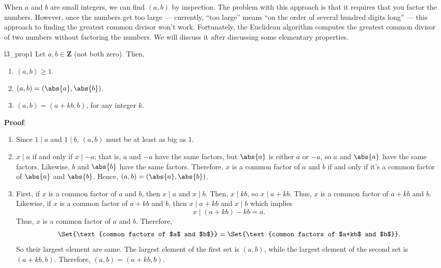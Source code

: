 When $a$ and $b$ are small integers, we can find $(a, b)$ by inspection. The problem
with this approach is that it requires that you factor the numbers. However, once
the numbers get too large --- currently, ``too large'' means ``on the order of several
hundred digits long'' --- this approach to finding the greatest common divisor won't
work. Fortunately, the Euclidean algorithm computes the greatest common divisor
of two numbers without factoring the numbers. We will discuss it after discussing
some elementary properties.
\begin{Proposition}{}{l3_prop1}
    Let $ a,b\in\mathbf{Z} $ (not both zero). Then,
    \begin{enumerate}[(1)]
        \item $ (a,b)\ge 1 $.
        \item $ (a,b)=(\abs{a},\abs{b}) $.
        \item $ (a,b)=(a+kb,b) $, for any integer $ k $.
    \end{enumerate}
    \tcblower{}
    \textbf{Proof}:
    \begin{enumerate}[(1)]
        \item Since $ 1\mid a $ and $ 1\mid b $, $ (a,b) $ must be at least as big as $ 1 $.
        \item $ x\mid a $ if and only if $ x\mid -a $; that is, $ a $ and $ -a $ have the same factors,
              but $ \abs{a} $ is either $ a $ or $ -a $, so $ a $ and $ \abs{a} $ have the same factors. Likewise,
              $ b $ and $ \abs{b} $ have the same factors. Therefore, $ x $ is a common factor of $ a $ and $ b $ if and only if it's
              a common factor of $ \abs{a} $ and $ \abs{b} $. Hence, $ (a,b)=(\abs{a},\abs{b}) $.
        \item First, if $ x $ is a common factor of $ a $ and $ b $, then $ x\mid a $ and $ x\mid b $. Then, $ x\mid kb $,
              so $ x\mid a+kb $. Thus, $ x $ is a common factor of $ a+kb $ and $ b $. Likewise, if $ x $ is a common factor of $ a+kb $
              and $ b $, then $ x\mid a+kb $ and $ x\mid b $ which implies
              \[ x\mid (a+kb)-kb=a. \]
              Thus, $ x $ is a common factor of $ a $ and $ b $. Therefore,
              \[ \Set{\text{common factors of $a$ and $b$}}=\Set{\text{common factors of $a+kb$ and $b$}}. \]
              So their largest element are same. The largest element of the first
              set is $(a, b)$, while the largest element of the second set is $(a + kb,b)$. Therefore,
              $(a, b) = (a + kb, b)$.
    \end{enumerate}
\end{Proposition}
